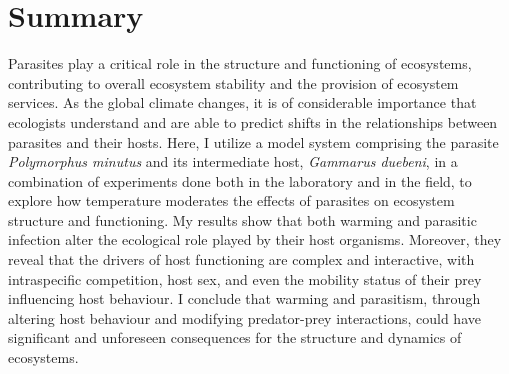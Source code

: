 \chapter*{Summary}

Parasites play a critical role in the structure and functioning of ecosystems, contributing to overall ecosystem stability and the provision of ecosystem services. As the global climate changes, it is of considerable importance that ecologists understand and are able to predict shifts in the relationships between parasites and their hosts. Here, I utilize a model system comprising the parasite \emph{Polymorphus minutus} and its intermediate host, \emph{Gammarus duebeni}, in a combination of experiments done both in the laboratory and in the field, to explore how temperature moderates the effects of parasites on ecosystem structure and functioning. My results show that both warming and parasitic infection alter the ecological role played by their host organisms. Moreover, they reveal that the drivers of host functioning are complex and interactive, with intraspecific competition, host sex, and even the mobility status of their prey influencing host behaviour. I conclude that warming and parasitism, through altering host behaviour and modifying predator-prey interactions, could have significant and unforeseen consequences for the structure and dynamics of ecosystems.